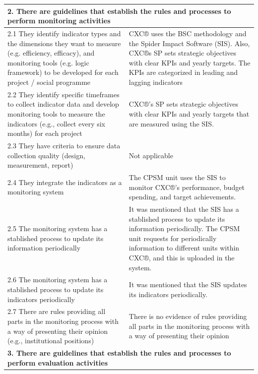 \documentclass[
  10pt,
]{book}
\begin{document}
\begin{table}
\begin{tabular}[t]{l|l}
\hline
\multicolumn{2}{l}{\textbf{2. There are guidelines that establish the rules and processes to perform monitoring activities}}\\
\hline
\hspace{1em}2.1 They identify indicator types and the dimensions they want to measure (e.g. efficiency, efficacy), and monitoring tools (e.g. logic framework) to be developed for each project / social programme & CXC® uses the BSC methodology and the  Spider Impact Software (SIS). Also, CXC®s SP sets strategic objectives with clear KPIs and yearly targets. The KPIs are categorized in leading and lagging indicators\\
\hline
\hspace{1em}2.2 They identify specific timeframes to collect indicator data and develop monitoring tools to measure the indicators (e.g., collect every six months) for each project & CXC®’s SP sets strategic objectives with clear KPIs and yearly targets that are measured using the SIS.\\
\hline
\hspace{1em}2.3 They have criteria to ensure data collection quality (design, measurement, report) & Not applicable\\
\hline
\hspace{1em}2.4 They integrate the indicators as a monitoring system & The CPSM unit uses the SIS to monitor CXC®’s performance, budget spending, and target achievements.\\
\hline
\hspace{1em}2.5 The monitoring system has a stablished process to update its information periodically & It was mentioned that the SIS has a stablished process to update its information periodically. The CPSM unit requests for periodically information to different units within CXC®, and this is uploaded in the system.\\
\hline
\hspace{1em}2.6 The monitoring system has a stablished process to update its indicators periodically & It was mentioned that the SIS updates its indicators periodically.\\
\hline
\hspace{1em}2.7 There are rules providing all parts in the monitoring process with a way of presenting their opinion (e.g., institutional positions) & There is no evidence of rules providing all parts in the monitoring process with a way of presenting their opinion\\
\hline
\multicolumn{2}{l}{\textbf{3. There are guidelines that establish the rules and processes to perform evaluation activities}}\\

\end{tabular}
\end{table}
\end{document}
